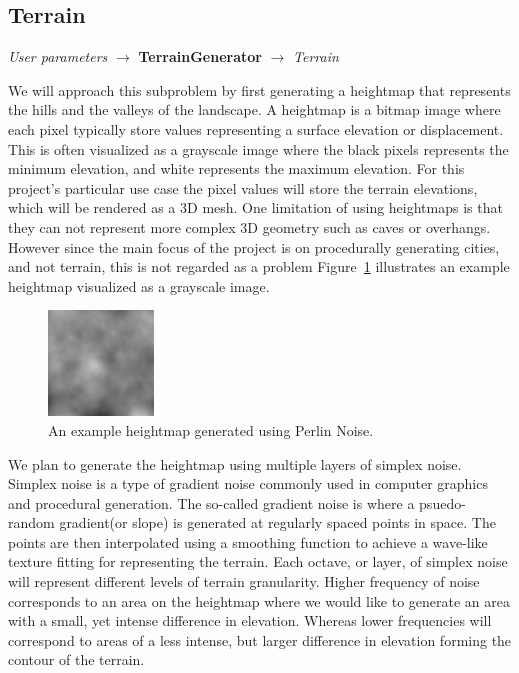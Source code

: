 \subsection{Terrain}
\begin{center}
  \textit{User parameters} $\rightarrow$ \textbf{TerrainGenerator}  $\rightarrow$ \textit{Terrain}
\end{center}

We will approach this subproblem by first generating a heightmap that represents the hills and the valleys of the landscape.
A heightmap is a bitmap image where each pixel typically store values representing a surface elevation or displacement.
This is often visualized as a grayscale image where the black pixels represents the minimum elevation, and white represents the maximum elevation.
For this project's particular use case the pixel values will store the terrain elevations, which will be rendered as a 3D mesh.
One limitation of using heightmaps is that they can not represent more complex 3D geometry such as caves or overhangs. However since the main focus of the project is on procedurally generating cities, and not terrain, this is not regarded as a problem
Figure~\ref{fig:heightmap} illustrates an example heightmap visualized as a grayscale image.

\begin{figure}[h]
  \centering
  \includegraphics[width=0.25\textwidth]{figure/heightmap.png}
  \caption{An example heightmap generated using Perlin Noise.}
  \label{fig:heightmap}
\end{figure}

We plan to generate the heightmap using multiple layers of simplex noise.
Simplex noise is a type of gradient noise commonly used in computer graphics and procedural generation.
The so-called gradient noise is where a psuedo-random gradient(or slope) is generated at regularly spaced points in space.
The points are then interpolated using a smoothing function to achieve a wave-like texture fitting for representing the terrain.
Each octave, or layer, of simplex noise will represent different levels of terrain granularity.
Higher frequency of noise corresponds to an area on the heightmap where we would like to generate an area with a small, yet intense difference in elevation.
Whereas lower frequencies will correspond to areas of a less intense, but larger difference in elevation forming the contour of the terrain.

